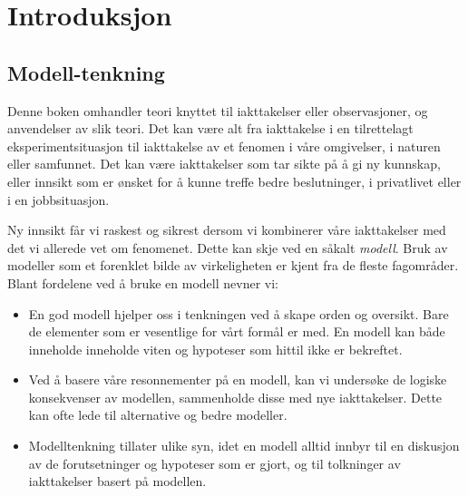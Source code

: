 \chapter{Introduksjon}
\label{kap:introduksjon} %

\section{Modell-tenkning}
Denne boken omhandler teori knyttet til iakttakelser eller observasjoner,
og anvendelser av slik teori. Det kan være alt fra iakttakelse i en
tilrettelagt  eksperiment\-situasjon til iakttakelse av et fenomen i våre 
omgivelser, i naturen eller samfunnet. Det kan være iakttakelser som tar 
sikte på å gi ny kunnskap, eller innsikt som er ønsket for å 
kunne treffe bedre beslutninger, i privatlivet eller i en jobbsituasjon.

Ny innsikt får vi raskest og sikrest dersom vi kombinerer våre 
iakttakelser med det vi allerede vet om fenomenet. Dette kan skje ved en 
såkalt {\em modell}. Bruk av modeller som et forenklet bilde av 
virkeligheten er kjent fra de fleste fagområder. Blant fordelene ved å
bruke en modell nevner vi:

\begin{itemize}
\item 
     En god modell hjelper oss i tenkningen ved å skape orden og oversikt.
     Bare de elementer som er vesentlige for vårt formål er med.
     En modell kan både inneholde inneholde viten og hypoteser som hittil
     ikke er bekreftet.
\item
     Ved å basere våre resonnementer på en modell, kan vi
     undersøke de logiske konsekvenser av modellen, sammenholde disse med nye
     iakttakelser. Dette kan ofte lede til alternative og bedre modeller.
\item
     Modelltenkning tillater ulike syn, idet en modell alltid
     innbyr til en diskusjon av de forutsetninger og hypoteser som er gjort,
     og til tolk\-ninger av iakttakelser basert på modellen. 
\end{itemize}

